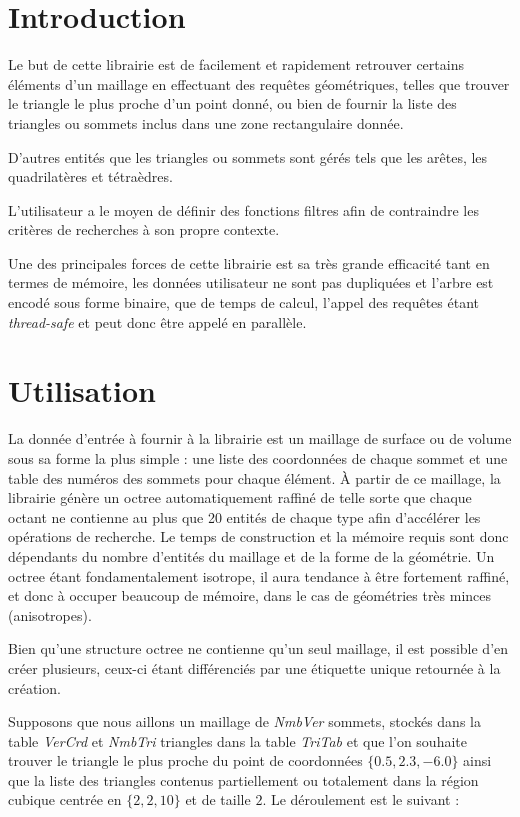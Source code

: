\documentclass[a4paper,12pt]{article}
\begin{document}
\section{Introduction}
Le but de cette librairie est de facilement et rapidement retrouver certains éléments d'un maillage en effectuant des requêtes géométriques, telles que trouver le triangle le plus proche d'un point donné, ou bien de fournir la liste des triangles ou sommets inclus dans une zone rectangulaire donnée.

D'autres entités que les triangles ou sommets sont gérés tels que les arêtes, les quadrilatères et tétraèdres.

L'utilisateur a le moyen de définir des fonctions filtres afin de contraindre les critères de recherches à son propre contexte.

Une des principales forces de cette librairie est sa très grande efficacité tant en termes de mémoire, les données utilisateur ne sont pas dupliquées et l'arbre est encodé sous forme binaire, que de temps de calcul, l'appel des requêtes étant \emph{thread-safe} et peut donc être appelé en parallèle.

%
%

\section{Utilisation}
La donnée d'entrée à fournir à la librairie est un maillage de surface ou de volume sous sa forme la plus simple : une liste des coordonnées de chaque sommet et une table des numéros des sommets pour chaque élément. À partir de ce maillage, la librairie génère un octree automatiquement raffiné de telle sorte que chaque octant ne contienne au plus que 20 entités de chaque type afin d'accélérer les opérations de recherche. Le temps de construction et la mémoire requis sont donc dépendants du nombre d'entités du maillage et de la forme de la géométrie. Un octree étant fondamentalement isotrope, il aura tendance à être fortement raffiné, et donc à occuper beaucoup de mémoire, dans le cas de géométries très minces (anisotropes).

Bien qu'une structure octree ne contienne qu'un seul maillage, il est possible d'en créer plusieurs, ceux-ci étant différenciés par une étiquette unique retournée à la création.

Supposons que nous aillons un maillage de \emph{NmbVer} sommets, stockés dans la table \emph{VerCrd} et \emph{NmbTri} triangles dans la table \emph{TriTab} et que l'on souhaite trouver le triangle le plus proche du point de coordonnées $\{0.5, 2.3, -6.0\}$ ainsi que la liste des triangles contenus partiellement ou totalement dans la région cubique centrée en $\{2,2,10\}$ et de taille $2$. Le déroulement est le suivant :
\end{document}
